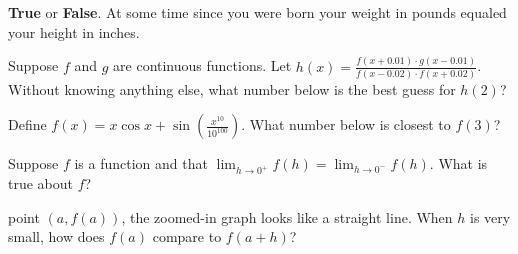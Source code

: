 \documentclass{ximera}
\newcommand{\recommendation}[1]{}
\newcommand{\GoodQuestions}[1]{}
\begin{document}
\begin{problem}
  \recommendation{Vic} \GoodQuestions{Subject: Continuity and the
    Intermediate Value Theorem 7P}
  \textbf{True} or \textbf{False}. At some time since you were born
  your weight in pounds equaled your height in inches.
\begin{multipleChoice}
\end{multipleChoice}
\end{problem}


\begin{problem}
  Suppose $f$ and $g$ are continuous functions.  Let $h(x) = \frac{f(x+0.01) \cdot g(x - 0.01)}{f(x-0.02) \cdot f(x + 0.02)}$.  Without knowing anything else, what number below is the best guess for $h(2)$?
  \begin{multipleChoice}
  \end{multipleChoice}
\end{problem}

\begin{problem}
  Define $f(x) = x \cos x + \sin\left(\frac{x^{10}}{10^{100}}\right)$.  What number below is closest to $f(3)$?
  \begin{multipleChoice}
  \end{multipleChoice}
\end{problem}

\begin{problem}

  Suppose $f$ is a function and that $\lim_{h \to 0^{+}} f(h) = \lim_{h \to 0^{-}} f(h)$.  What is true about $f$?
  \begin{multipleChoice}
  \end{multipleChoice}
\end{problem}

\begin{problem}
  point $(a,f(a))$, the zoomed-in graph looks like a straight line.
  When $h$ is very small, how does $f(a)$ compare to $f(a+h)$?
  \begin{multipleChoice}
  \end{multipleChoice}
\end{problem}
\end{document}
